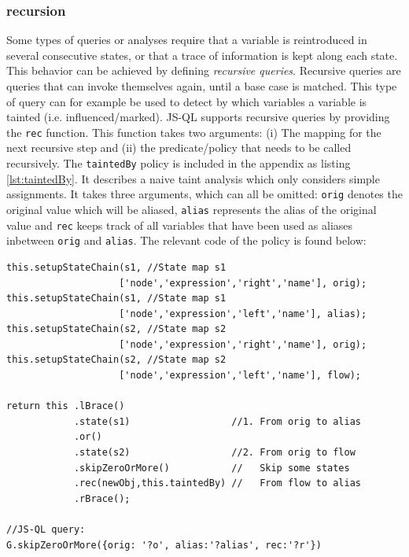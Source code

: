 \subsubsection{recursion}
Some types of queries or analyses require that a variable is reintroduced in several consecutive states, or that a trace of information is kept along each state. This behavior can be achieved by defining \textit{recursive queries}. Recursive queries are queries that can invoke themselves again, until a base case is matched. This type of query can for example be used to detect by which variables a variable is tainted (i.e. influenced/marked). JS-QL supports recursive queries by providing the \texttt{rec} function. This function takes two arguments: (i) The mapping for the next recursive step and (ii) the predicate/policy that needs to be called recursively. The \texttt{taintedBy} policy is included in the appendix as listing \ref{lst:taintedBy}. It describes a naive taint analysis which only considers simple assignments. It takes three arguments, which can all be omitted: \texttt{orig} denotes the original value which will be aliased, \texttt{alias} represents the alias of the original value and \texttt{rec} keeps track of all variables that have been used as aliases inbetween \texttt{orig} and \texttt{alias}. The relevant code of the policy is found below:

\begin{lstlisting}[label={lst:recursivePolicy},language=JSQL, caption=Recursive call of the \texttt{taintedBy} policy,mathescape=true]
this.setupStateChain(s1, //State map s1
                    ['node','expression','right','name'], orig); 
this.setupStateChain(s1, //State map s1
                    ['node','expression','left','name'], alias); 
this.setupStateChain(s2, //State map s2
                    ['node','expression','right','name'], orig);
this.setupStateChain(s2, //State map s2
                    ['node','expression','left','name'], flow);

return this .lBrace()
            .state(s1)                  //1. From orig to alias
            .or()
            .state(s2)                  //2. From orig to flow
            .skipZeroOrMore()           //   Skip some states
            .rec(newObj,this.taintedBy) //   From flow to alias
            .rBrace();

//JS-QL query:
G.skipZeroOrMore({orig: '?o', alias:'?alias', rec:'?r'})
\end{lstlisting}

